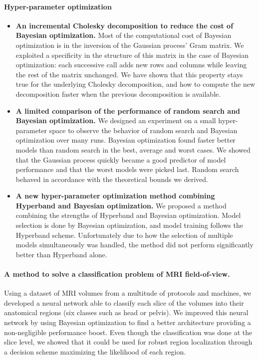 \paragraph*{Hyper-parameter optimization}
\begin{itemize}
    \item \textbf{An incremental Cholesky decomposition to reduce the cost of Baye\-sian optimization.} Most of the computational cost of Bayesian optimization is in the inversion of the Gaussian process' Gram matrix. We exploited a specificity in the structure of this matrix in the case of Bayesian optimization: each successive call adds new rows and columns while leaving the rest of the matrix unchanged. We have shown that this property stays true for the underlying Cholesky decomposition, and how to compute the new decomposition faster when the previous decomposition is available.
    \item \textbf{A limited comparison of the performance of random search and Bayesian optimization.} We designed an experiment on a small hyper-parameter space to observe the behavior of random search and Bayesian optimization over many runs. Bayesian optimization found faster better models than random search in the best, average and worst cases. We showed that the Gaussian process quickly became a good predictor of model performance and that the worst models were picked last. Random search behaved in accordance with the theoretical bounds we derived. 
    \item \textbf{A new hyper-parameter optimization method combining Hyperband and Bayesian optimization.} We proposed a method combining the strengths of Hyperband and Bayesian optimization. Model selection is done by Bayesian optimization, and model training follows the Hyperband scheme. Unfortunately due to how the selection of multiple models simultaneously was handled, the method did not perform significantly better than Hyperband alone.
\end{itemize}

\paragraph*{A method to solve a classification problem of MRI field-of-view.}
Using a dataset of MRI volumes from a multitude of protocols and machines, we developed a neural network able to classify each slice of the volumes into their anatomical regions (six classes such as head or pelvis). We improved this neural network by using Bayesian optimization to find a better architecture providing a non-negligible performance boost. Even though the classification was done at the slice level, we showed that it could be used for robust region localization through a decision scheme maximizing the likelihood of each region.

